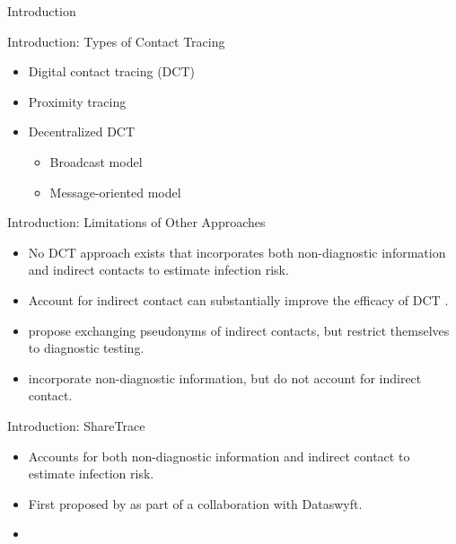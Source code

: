 \documentclass[12pt]{beamer}
\begin{document}
\begin{frame}
	\maketitle
\end{frame}

\begin{section}{Introduction}

\begin{frame}{Introduction: Types of Contact Tracing}
  \begin{itemize}
    \item Digital contact tracing (DCT)
    \item Proximity tracing
    \item Decentralized DCT
      \begin{itemize}
        \item Broadcast model
        \item Message-oriented model
      \end{itemize}
  \end{itemize}
\end{frame}

\begin{frame}{Introduction: Limitations of Other Approaches}
  \begin{itemize}
    \item No DCT approach exists that incorporates both non-diagnostic information and indirect contacts to estimate infection risk.
    \item Account for indirect contact can substantially improve the efficacy of DCT \citep{PozoMartin2023}.
    \item \citet{Cherini2023} propose exchanging pseudonyms of indirect contacts, but restrict themselves to diagnostic testing.
    \item \citet{Gupta2023} incorporate non-diagnostic information, but do not account for indirect contact.
  \end{itemize}
\end{frame}

\begin{frame}{Introduction: ShareTrace}
  \begin{itemize}
    \item Accounts for both non-diagnostic information and indirect contact to estimate infection risk.
    \item First proposed by \citet{Ayday2020, Ayday2021} as part of a collaboration with Dataswyft.
    \item \citet{Ayday2021} 
  \end{itemize}
\end{frame}
\end{section}
\end{document}
